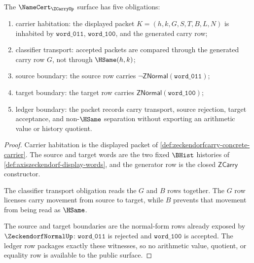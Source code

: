 \begin{theorem}
\label{thm:zeckendorfcarry-namecert-obligations}
The $\NameCert_{\ZCarryUp}$ surface has five obligations:
\begin{enumerate}
\item carrier habitation: the displayed packet $K=(h,k,G,S,T,B,L,N)$ is inhabited by $\mathtt{word\_011}$, $\mathtt{word\_100}$, and the generated carry row;
\item classifier transport: accepted packets are compared through the generated carry row $G$, not through $\HSame(h,k)$;
\item source boundary: the source row carries $\neg\mathsf{ZNormal}(\mathtt{word\_011})$;
\item target boundary: the target row carries $\mathsf{ZNormal}(\mathtt{word\_100})$;
\item ledger boundary: the packet records carry transport, source rejection, target acceptance, and non-$\HSame$ separation without exporting an arithmetic value or history quotient.
\end{enumerate}
\end{theorem}
\begin{proof}
Carrier habitation is the displayed packet of \autoref{def:zeckendorfcarry-concrete-carrier}. The source and target words are the two fixed $\BHist$ histories of \autoref{def:axiszeckendorf-display-words}, and the generator row is the closed $\mathsf{ZCarry}$ constructor.

The classifier transport obligation reads the $G$ and $B$ rows together. The $G$ row licenses carry movement from source to target, while $B$ prevents that movement from being read as $\HSame$.

The source and target boundaries are the normal-form rows already exposed by $\ZeckendorfNormalUp$: $\mathtt{word\_011}$ is rejected and $\mathtt{word\_100}$ is accepted. The ledger row packages exactly these witnesses, so no arithmetic value, quotient, or equality row is available to the public surface.
\end{proof}


